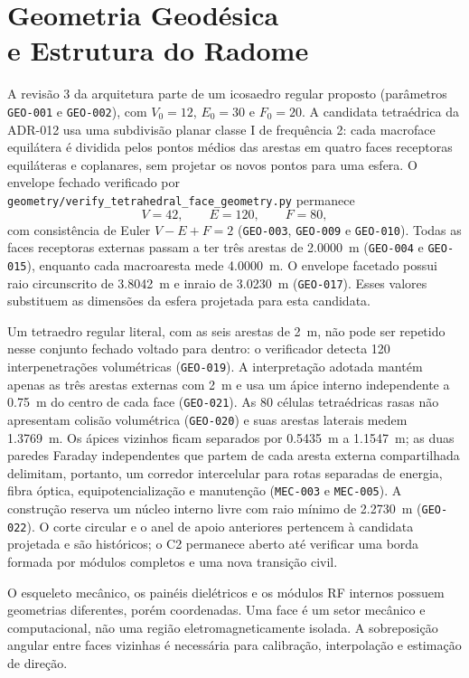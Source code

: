 \chapter[Geometria Geodésica e Estrutura do Radome]{Geometria Geodésica\\e Estrutura do Radome}

A revisão 3 da arquitetura parte de um icosaedro regular proposto (parâmetros \texttt{GEO-001} e \texttt{GEO-002}), com $V_0=12$, $E_0=30$ e $F_0=20$. A candidata tetraédrica da ADR-012 usa uma subdivisão planar classe I de frequência 2: cada macroface equilátera é dividida pelos pontos médios das arestas em quatro faces receptoras equiláteras e coplanares, sem projetar os novos pontos para uma esfera. O envelope fechado verificado por \texttt{geometry/verify\_tetrahedral\_face\_geometry.py} permanece
\[
V=42,\qquad E=120,\qquad F=80,
\]
com consistência de Euler $V-E+F=2$ (\texttt{GEO-003}, \texttt{GEO-009} e \texttt{GEO-010}). Todas as faces receptoras externas passam a ter três arestas de \SI{2.0000}{m} (\texttt{GEO-004} e \texttt{GEO-015}), enquanto cada macroaresta mede \SI{4.0000}{m}. O envelope facetado possui raio circunscrito de \SI{3.8042}{m} e inraio de \SI{3.0230}{m} (\texttt{GEO-017}). Esses valores substituem as dimensões da esfera projetada para esta candidata.

Um tetraedro regular literal, com as seis arestas de \SI{2}{m}, não pode ser repetido nesse conjunto fechado voltado para dentro: o verificador detecta 120 interpenetrações volumétricas (\texttt{GEO-019}). A interpretação adotada mantém apenas as três arestas externas com \SI{2}{m} e usa um ápice interno independente a \SI{0.75}{m} do centro de cada face (\texttt{GEO-021}). As 80 células tetraédricas rasas não apresentam colisão volumétrica (\texttt{GEO-020}) e suas arestas laterais medem \SI{1.3769}{m}. Os ápices vizinhos ficam separados por \SI{0.5435}{m} a \SI{1.1547}{m}; as duas paredes Faraday independentes que partem de cada aresta externa compartilhada delimitam, portanto, um corredor intercelular para rotas separadas de energia, fibra óptica, equipotencialização e manutenção (\texttt{MEC-003} e \texttt{MEC-005}). A construção reserva um núcleo interno livre com raio mínimo de \SI{2.2730}{m} (\texttt{GEO-022}). O corte circular e o anel de apoio anteriores pertencem à candidata projetada e são históricos; o C2 permanece aberto até verificar uma borda formada por módulos completos e uma nova transição civil.

O esqueleto mecânico, os painéis dielétricos e os módulos RF internos possuem geometrias diferentes, porém coordenadas. Uma face é um setor mecânico e computacional, não uma região eletromagneticamente isolada. A sobreposição angular entre faces vizinhas é necessária para calibração, interpolação e estimação de direção.

